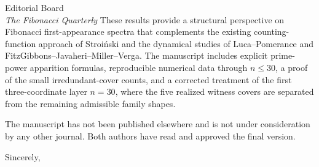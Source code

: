 \documentclass[11pt]{letter}
\begin{document}
\begin{letter}{%
Editorial Board\\
\emph{The Fibonacci Quarterly}}
These results provide a structural perspective on Fibonacci first-appearance
spectra that complements the existing counting-function approach of
Stroi\'nski and the dynamical studies of Luca--Pomerance and
FitzGibbons--Javaheri--Miller--Verga. The manuscript includes explicit
prime-power apparition formulas, reproducible numerical data through
$n\le30$, a proof of the small irredundant-cover counts, and a corrected
treatment of the first three-coordinate layer \(n=30\), where the five
realized witness covers are separated from the remaining admissible family
shapes.

The manuscript has not been published elsewhere and is not under
consideration by any other journal. Both authors have read and approved the
final version.

\closing{Sincerely,}

\end{letter}
\end{document}
